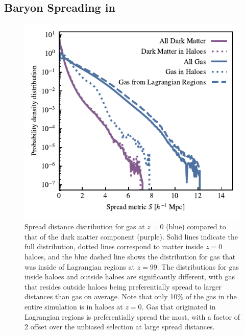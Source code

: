 \subsection{Baryon Spreading in \simba{}}

\begin{figure}
    \centering
    \includegraphics{figures/s50j7kAHF/distance_plot_split_by_component+AHF_updated.pdf}
    \vspace{-0.7cm}
    \caption{Spread distance distribution for gas at $z=0$ (blue) compared to
    that of the dark matter component (purple). Solid lines indicate the full
    distribution, dotted lines correspond to matter inside $z=0$ haloes, and
    the blue dashed line shows the distribution for gas that was inside of
    Lagrangian regions at $z=99$. The distributions for gas inside haloes and
    outside haloes are significantly different, with gas that resides outside
    haloes being preferentially spread to larger distances than gas on
    average. Note that only 10\% of the gas in the entire simulation is in
    haloes at $z=0$. Gas that originated in Lagrangian regions is
    preferentially spread the most, with a factor of 2 offset over the
    unbiased selection at large spread distances.}
    \label{fig:distbaryon}
\end{figure}


